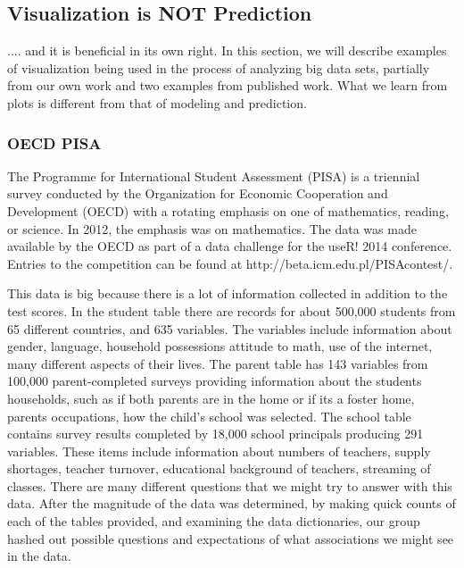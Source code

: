 \documentclass{article}
\begin{document}
\subsection{Visualization is NOT Prediction}

.... and it is beneficial in its own right. In this section, we will describe examples of visualization being used in the process of analyzing big data sets, partially from our own work and two examples from published work. What we learn from plots is different from that of modeling and prediction.


\subsubsection{OECD PISA}

The Programme for International Student Assessment (PISA) is a triennial survey conducted by the Organization for Economic Cooperation and Development (OECD) with a rotating emphasis on one of mathematics, reading, or science. In 2012, the emphasis was on mathematics. The data was made available by the OECD as part of a data challenge for the useR! 2014 conference. Entries to the competition can be found at http://beta.icm.edu.pl/PISAcontest/.

This data is big because there is a lot of information collected in addition to the test scores. In the student table there are records for about 500,000 students from 65 different countries, and 635 variables. The variables include information about gender, language, household possessions attitude to math, use of the internet, many different aspects of their lives. The parent table has 143 variables from 100,000 parent-completed surveys providing information about the students households, such as if both parents are in the home or if its a foster home, parents occupations, how the child's school was selected. The school table contains survey results completed by 18,000 school principals producing 291 variables. These items include information about numbers of teachers, supply shortages, teacher turnover, educational background of teachers, streaming of classes. There are many different questions that we might try to answer with this data. After the magnitude of the data was determined, by making quick counts of each of the tables provided, and examining the data dictionaries, our group hashed out possible questions and expectations of what associations we might see in the data.
\end{document}
